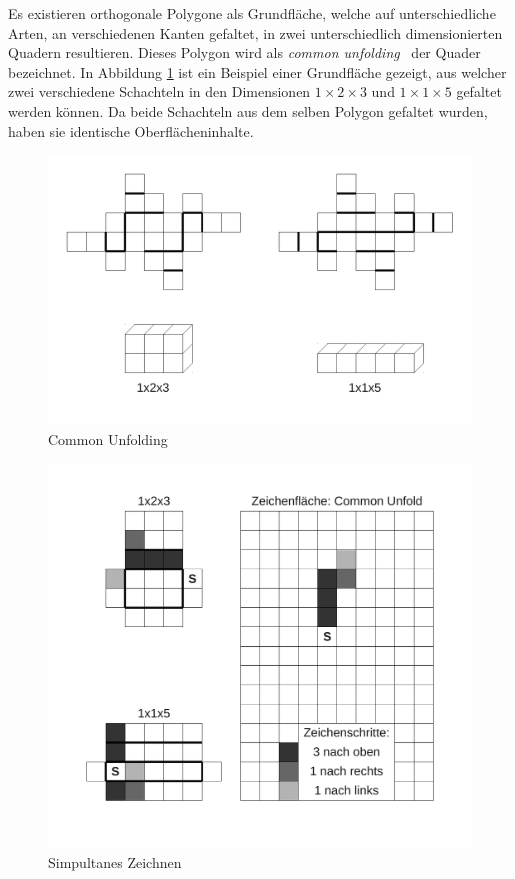 Es existieren orthogonale Polygone als Grundfläche, welche auf unterschiedliche Arten, \dH an verschiedenen Kanten gefaltet, in zwei unterschiedlich dimensionierten Quadern resultieren. Dieses Polygon wird als \emph{common unfolding}~\cite{commonUnfold} der Quader bezeichnet. In Abbildung \ref{fig:Common-Unfolding} ist ein Beispiel einer Grundfläche gezeigt, aus welcher zwei verschiedene Schachteln in den Dimensionen $1\times2\times3$ und $1\times1\times5$ gefaltet werden können. Da beide Schachteln aus dem selben Polygon gefaltet wurden, haben sie identische Oberflächeninhalte.

\begin{figure}[htbp]
\centering
\includegraphics[scale=0.5]{03_pics/commonUnfold_beispiel1.pdf}
\caption{Common Unfolding}
\label{fig:Common-Unfolding}
\end{figure}

\begin{figure}[htbp]
\centering
\includegraphics[scale=0.5]{03_pics/simulatnes_zeichnen.pdf}
\caption{Simpultanes Zeichnen}
\label{fig:Simpultanes-Zeichnen}
\end{figure}


